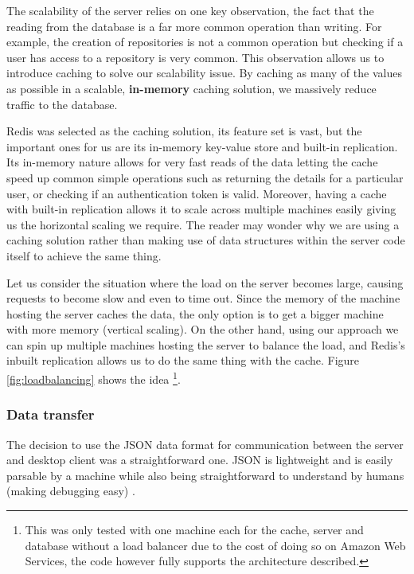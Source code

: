 The scalability of the server relies on one key observation, the fact that the reading from the database is a far more common operation than writing. For example, the creation of repositories is not a common operation but checking if a user has access to a repository is very common. This observation allows us to introduce caching to solve our scalability issue. By caching as many of the values as possible in a scalable, \textbf{in-memory} caching solution, we massively reduce traffic to the database.

Redis \cite{redis} was selected as the caching solution, its feature set is vast, but the important ones for us are its in-memory key-value store and built-in replication. Its in-memory nature allows for very fast reads of the data letting the cache speed up common simple operations such as returning the details for a particular user, or checking if an authentication token is valid.  Moreover, having a cache with built-in replication allows it to scale across multiple machines easily giving us the horizontal scaling we require. The reader may wonder why we are using a caching solution rather than making use of data structures within the server code itself to achieve the same thing.

Let us consider the situation where the load on the server becomes large, causing requests to become slow and even to time out. Since the memory of the machine hosting the server caches the data, the only option is to get a bigger machine with more memory (vertical scaling). On the other hand, using our approach we can spin up multiple machines hosting the server to balance the load, and Redis's inbuilt replication allows us to do the same thing with the cache. Figure \ref{fig:loadbalancing} shows the idea \footnote{This was only tested with one machine each for the cache, server and database without a load balancer due to the cost of doing so on Amazon Web Services, the code however fully supports the architecture described.}.


\subsubsection{Data transfer}

The decision to use the JSON data format for communication between the server and desktop client was a straightforward one. JSON is lightweight and is easily parsable by a machine while also being straightforward to understand by humans (making debugging easy) \cite{json}.

